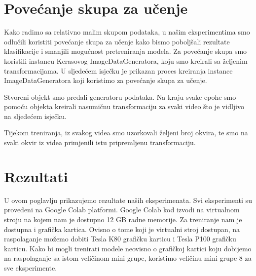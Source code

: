 \documentclass[times, utf8, diplomski,  numeric]{fer}
\begin{document}
\section{Povećanje skupa za učenje}
Kako radimo sa relativno malim skupom podataka, u našim eksperimentima smo odlučili koristiti povećanje skupa za učenje  kako bismo poboljšali rezultate klasifikacije i smanjili mogućnost pretreniranja modela. Za povećanje skupa smo koristili instancu Kerasovog ImageDataGeneratora, koju smo kreirali sa željenim transformacijama. U sljedećem isječku je prikazan proces kreiranja instance ImageDataGeneratora koji koristimo za povećanje skupa za učenje.

Stvoreni objekt smo predali generatoru podataka. Na kraju svake epohe smo pomoću objekta kreirali nasumičnu transformaciju za svaki video što je vidljivo na sljedećem isječku.

Tijekom treniranja, iz svakog videa smo uzorkovali željeni broj okvira, te smo na svaki okvir iz videa primjenili istu pripremljenu transformaciju. 

\section{Rezultati}
U ovom poglavlju prikazujemo rezultate naših eksperimenata. Svi eksperimenti su provedeni na Google Colab platformi. Google Colab kod izvodi na virtualnom stroju na kojem nam je dostupno 12 GB radne memorije. Za treniranje nam je dostupna i grafička kartica. Ovisno o tome koji je virtualni stroj dostupan, na raspolaganje možemo dobiti Tesla K80 grafičku karticu i Tesla P100 grafičku karticu. Kako bi mogli trenirati modele neovisno o grafičkoj kartici koju dobijemo na raspolaganje sa istom veličinom mini grupe, koristimo veličinu mini grupe 8 za sve eksperimente.
\end{document}
